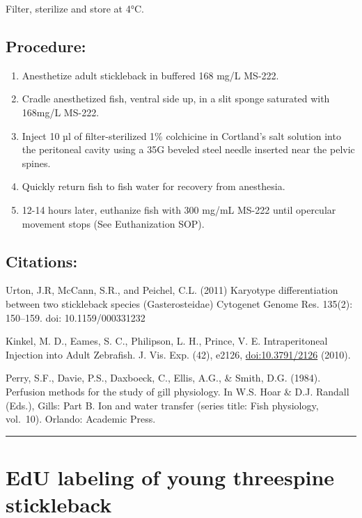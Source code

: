 \documentclass[
]{book}
\providecommand{\tightlist}{%
  \setlength{\itemsep}{0pt}\setlength{\parskip}{0pt}}
\begin{document}
Filter, sterilize and store at 4°C.

\hypertarget{procedure-12}{%
\subsection{Procedure:}\label{procedure-12}}

\begin{enumerate}
\def\labelenumi{\arabic{enumi}.}
\tightlist
\item
  Anesthetize adult stickleback in buffered 168 mg/L MS-222.
\item
  Cradle anesthetized fish, ventral side up, in a slit sponge saturated with 168mg/L MS-222.
\item
  Inject 10 µl of filter-sterilized 1\% colchicine in Cortland's salt solution into the peritoneal cavity using a 35G beveled steel needle inserted near the pelvic spines.
\item
  Quickly return fish to fish water for recovery from anesthesia.
\item
  12-14 hours later, euthanize fish with 300 mg/mL MS-222 until opercular movement stops (See Euthanization SOP).
\end{enumerate}

\hypertarget{citations}{%
\subsection{Citations:}\label{citations}}

Urton, J.R, McCann, S.R., and Peichel, C.L. (2011) Karyotype differentiation between two stickleback species (Gasterosteidae) Cytogenet Genome Res. 135(2): 150--159. doi: 10.1159/000331232

Kinkel, M. D., Eames, S. C., Philipson, L. H., Prince, V. E. Intraperitoneal Injection into Adult Zebrafish. J. Vis. Exp. (42), e2126, \url{doi:10.3791/2126} (2010).

Perry, S.F., Davie, P.S., Daxboeck, C., Ellis, A.G., \& Smith, D.G. (1984). Perfusion methods for the study of gill physiology. In W.S. Hoar \& D.J. Randall (Eds.), Gills: Part B. Ion and water transfer (series title: Fish physiology, vol.~10). Orlando: Academic Press.

\begin{center}\rule{0.5\linewidth}{0.5pt}\end{center}

\hypertarget{edu-labeling-of-young-threespine-stickleback}{%
\section{EdU labeling of young threespine stickleback}\label{edu-labeling-of-young-threespine-stickleback}}
\end{document}
